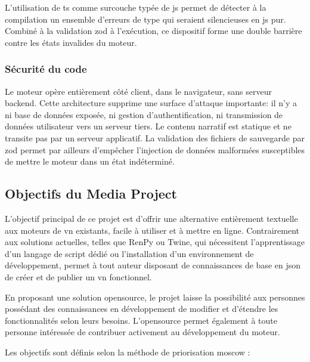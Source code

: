 L'utilisation de \gls{ts} comme surcouche typée de \gls{js} permet de détecter à la compilation un ensemble d'erreurs de type qui seraient silencieuses en \gls{js} pur. Combiné à la validation \gls{zod} à l'exécution, ce dispositif forme une double barrière contre les états invalides du moteur. \parencite{noauthor_starting_nodate}


\subsubsection{Sécurité du code}

Le moteur opère entièrement côté client, dans le navigateur, sans serveur \gls{backend}. Cette architecture supprime une surface d'attaque importante: il n'y a ni base de données exposée, ni gestion d'authentification, ni transmission de données utilisateur vers un serveur tiers. Le contenu narratif est statique et ne transite pas par un serveur applicatif. La validation des fichiers de sauvegarde par \gls{zod} permet par ailleurs d'empêcher l'injection de données malformées susceptibles de mettre le moteur dans un état indéterminé.


\subsection{Objectifs du Media Project} \label{sec:objMediaProject}

L'objectif principal de ce projet est d'offrir une alternative entièrement textuelle aux moteurs de \gls{vn} existants, facile à utiliser et à mettre en ligne. Contrairement aux solutions actuelles, telles que RenPy ou Twine, qui nécessitent l'apprentissage d'un langage de script dédié ou l'installation d'un environnement de développement, \nsits permet à tout auteur disposant de connaissances de base en \gls{json} de créer et de publier un \gls{vn} fonctionnel.

En proposant une solution \gls{opensource}, le projet laisse la possibilité aux personnes possédant des connaissances en développement de modifier et d'étendre les fonctionnalités selon leurs besoins. L'\gls{opensource} permet également à toute personne intéressée de contribuer activement au développement du moteur.

Les objectifs sont définis selon la méthode de priorisation \gls{moscow} \parencite{clegg_case_1994}:

